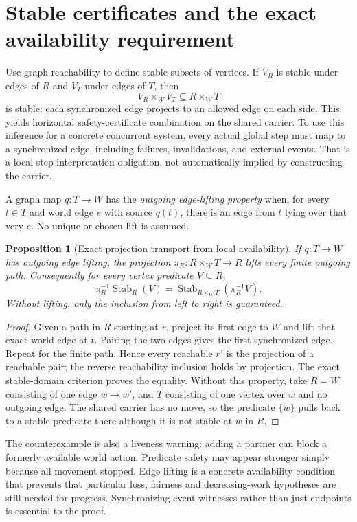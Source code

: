 \documentclass[11pt]{article}
\newtheorem{proposition}[theorem]{Proposition}
\begin{document}
\section{Stable certificates and the exact availability requirement}
Use graph reachability to define stable subsets of vertices. If $V_R$ is stable under edges of $R$ and $V_T$ under edges of $T$, then
\[
 V_R\times_W V_T\subseteq R\times_W T
\]
is stable: each synchronized edge projects to an allowed edge on each side. This yields horizontal safety-certificate combination on the shared carrier. To use this inference for a concrete concurrent system, every actual global step must map to a synchronized edge, including failures, invalidations, and external events. That is a local step interpretation obligation, not automatically implied by constructing the carrier.

A graph map $q:T\to W$ has the \emph{outgoing edge-lifting property} when, for every $t\in T$ and world edge $e$ with source $q(t)$, there is an edge from $t$ lying over that very $e$. No unique or chosen lift is assumed.

\begin{proposition}[Exact projection transport from local availability]
If $q:T\to W$ has outgoing edge lifting, the projection $\pi_R:R\times_W T\to R$ lifts every finite outgoing path. Consequently for every vertex predicate $V\subseteq R$,
\[
 \pi_R^{-1}\operatorname{Stab}_R(V)
 =\operatorname{Stab}_{R\times_W T}(\pi_R^{-1}V).
\]
Without lifting, only the inclusion from left to right is guaranteed.
\end{proposition}
\begin{proof}
Given a path in $R$ starting at $r$, project its first edge to $W$ and lift that exact world edge at $t$. Pairing the two edges gives the first synchronized edge. Repeat for the finite path. Hence every reachable $r'$ is the projection of a reachable pair; the reverse reachability inclusion holds by projection. The exact stable-domain criterion proves the equality. Without this property, take $R=W$ consisting of one edge $w\to w'$, and $T$ consisting of one vertex over $w$ and no outgoing edge. The shared carrier has no move, so the predicate $\{w\}$ pulls back to a stable predicate there although it is not stable at $w$ in $R$.
\end{proof}
The counterexample is also a liveness warning: adding a partner can block a formerly available world action. Predicate safety may appear stronger simply because all movement stopped. Edge lifting is a concrete availability condition that prevents that particular loss; fairness and decreasing-work hypotheses are still needed for progress. Synchronizing event witnesses rather than just endpoints is essential to the proof.
\end{document}
